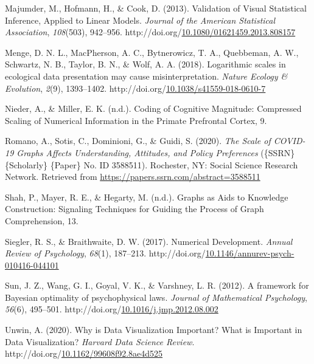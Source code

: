 \documentclass[print]{nuthesis}
\newlength{\cslhangindent}
\newenvironment{CSLReferences}%
{\setlength{\parindent}{0pt}%
\everypar{\setlength{\hangindent}{\cslhangindent}}\ignorespaces}%
{\par}
\begin{document}
\begin{CSLReferences}{1}{0}
\leavevmode\hypertarget{ref-majumder_validation_2013}{}%
Majumder, M., Hofmann, H., \& Cook, D. (2013). Validation of {Visual} {Statistical} {Inference}, {Applied} to {Linear} {Models}. \emph{Journal of the American Statistical Association}, \emph{108}(503), 942--956. http://doi.org/\href{https://doi.org/10.1080/01621459.2013.808157}{10.1080/01621459.2013.808157}

\leavevmode\hypertarget{ref-menge_logarithmic_2018}{}%
Menge, D. N. L., MacPherson, A. C., Bytnerowicz, T. A., Quebbeman, A. W., Schwartz, N. B., Taylor, B. N., \& Wolf, A. A. (2018). Logarithmic scales in ecological data presentation may cause misinterpretation. \emph{Nature Ecology \& Evolution}, \emph{2}(9), 1393--1402. http://doi.org/\href{https://doi.org/10.1038/s41559-018-0610-7}{10.1038/s41559-018-0610-7}

\leavevmode\hypertarget{ref-nieder_coding_nodate}{}%
Nieder, A., \& Miller, E. K. (n.d.). Coding of {Cognitive} {Magnitude}: {Compressed} {Scaling} of {Numerical} {Information} in the {Primate} {Prefrontal} {Cortex}, 9.

\leavevmode\hypertarget{ref-romano_scale_2020}{}%
Romano, A., Sotis, C., Dominioni, G., \& Guidi, S. (2020). \emph{The {Scale} of {COVID}-19 {Graphs} {Affects} {Understanding}, {Attitudes}, and {Policy} {Preferences}} (\{SSRN\} \{Scholarly\} \{Paper\} No. ID 3588511). Rochester, NY: Social Science Research Network. Retrieved from \url{https://papers.ssrn.com/abstract=3588511}

\leavevmode\hypertarget{ref-shah_graphs_nodate}{}%
Shah, P., Mayer, R. E., \& Hegarty, M. (n.d.). Graphs as {Aids} to {Knowledge} {Construction}: {Signaling} {Techniques} for {Guiding} the {Process} of {Graph} {Comprehension}, 13.

\leavevmode\hypertarget{ref-siegler_numerical_2017}{}%
Siegler, R. S., \& Braithwaite, D. W. (2017). Numerical {Development}. \emph{Annual Review of Psychology}, \emph{68}(1), 187--213. http://doi.org/\href{https://doi.org/10.1146/annurev-psych-010416-044101}{10.1146/annurev-psych-010416-044101}

\leavevmode\hypertarget{ref-sun_framework_2012}{}%
Sun, J. Z., Wang, G. I., Goyal, V. K., \& Varshney, L. R. (2012). A framework for {Bayesian} optimality of psychophysical laws. \emph{Journal of Mathematical Psychology}, \emph{56}(6), 495--501. http://doi.org/\href{https://doi.org/10.1016/j.jmp.2012.08.002}{10.1016/j.jmp.2012.08.002}

\leavevmode\hypertarget{ref-unwin_why_2020}{}%
Unwin, A. (2020). Why is {Data} {Visualization} {Important}? {What} is {Important} in {Data} {Visualization}? \emph{Harvard Data Science Review}. http://doi.org/\href{https://doi.org/10.1162/99608f92.8ae4d525}{10.1162/99608f92.8ae4d525}


\end{CSLReferences}
\end{document}
